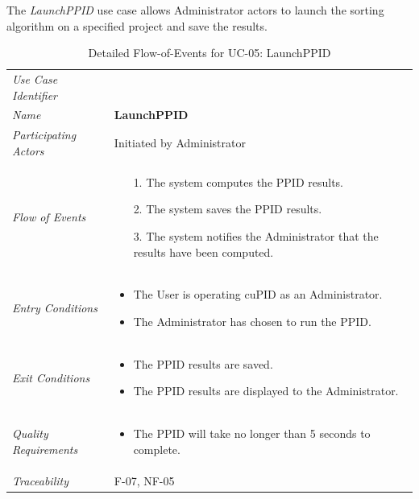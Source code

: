 \documentclass[12pt,letterpaper]{article}
\begin{document}
The {\it LaunchPPID} use case allows Administrator actors to launch the sorting algorithm on a specified project and save the results.

\begin{table}[H]
	\caption{Detailed Flow-of-Events for UC-05: LaunchPPID}
	\begin{tabu} to 
		\toprule
		Use Case Identifier & \launchppid{} \\
		Name & {\bf LaunchPPID} \\
		Participating Actors & Initiated by Administrator \\
		Flow of Events & 
		\begin{minipage}[t]{\linewidth}
		    \begin{enumerate}
			    \item[1.] The system computes the PPID results.
			    \item[2.] The system saves the PPID results.
			    \item[3.] The system notifies the Administrator that the results have been computed.
			\end{enumerate}
	    \end{minipage} \\

		Entry Conditions &
		\begin{minipage}[t]{\linewidth}
			\begin{itemize}
			    \item The User is operating cuPID as an Administrator.
			    \item The Administrator has chosen to run the PPID.
	        \end{itemize}
	    \end{minipage} \\

		Exit Conditions &
		\begin{minipage}[t]{\linewidth}
			\begin{itemize}
			    \item The PPID results are saved.
			    \item The PPID results are displayed to the Administrator.
	        \end{itemize}
	    \end{minipage} \\

		Quality Requirements &
		\begin{minipage}[t]{\linewidth}
			\begin{itemize}
			    \item The PPID will take no longer than 5 seconds to complete.
	        \end{itemize}
	    \end{minipage} \\

		Traceability & F-07, NF-05 \\
		\toprule
	\end{tabu}
\end{table}
\end{document}
